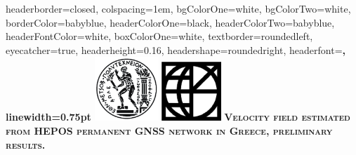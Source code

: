 \documentclass[landscape,a0paper,fontscale=0.346]{baposter} %
\begin{document}
\begin{poster}
{
headerborder=closed, %
colspacing=1em, %
bgColorOne=white, %
bgColorTwo=white, %
borderColor=babyblue, %
headerColorOne=black, %
headerColorTwo=babyblue, %
headerFontColor=white, %
boxColorOne=white, %
textborder=roundedleft, %
eyecatcher=true, %
headerheight=0.16\textheight, %
headershape=roundedright, %
headerfont=\Large\bf\textsc, %
linewidth=0.75pt %
}
%
{\includegraphics[height=6.5em]{../../logos/ntua.png} \hspace*{0.5cm}\includegraphics[height=6em]{../../logos/DSOtrans.png}} %
{\bf\textsc{Velocity field estimated from HEPOS permanent GNSS network in Greece, preliminary results.}\vspace{0.3em} } %

\end{poster}
\end{document}
